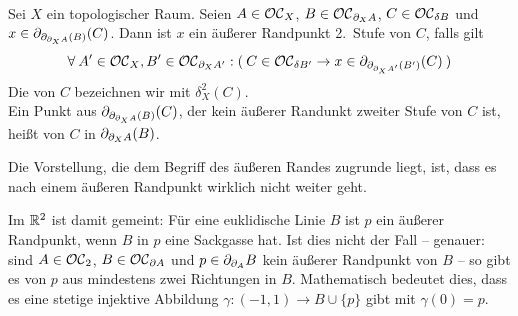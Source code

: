     \begin{dfn}\label{def:aeusserer-rand-2} \ \vspace{8pt}

        \noindent
        Sei $X$ ein topologischer Raum.
        Seien $A \in \mathcal{OC}_X$, $B \in \mathcal{OC}_{\partial_X A}$, $C \in \mathcal{OC}_{\delta B}$ und $x \in \partial_{\partial_{\partial_X A}(B)}(C)$. Dann ist $x$ ein äußerer Randpunkt 2.~Stufe von $C$, falls gilt
        \begin{align*}
            \forall\: A' \in \mathcal{OC}_X, B' \in \mathcal{OC}_{\partial_X A'} : (\: C \in \mathcal{OC}_{\delta B'} \rightarrow x \in \partial_{\partial_{\partial_X A'}(B')}(C) \:)
        \end{align*}
        Die  von $C$ bezeichnen wir mit $\delta_X^2(C)$.\\
        Ein Punkt aus $\partial_{\partial_{\partial_X A}(B)}(C)$, der kein äußerer Randunkt zweiter Stufe von $C$ ist, heißt  von $C$ in $\partial_{\partial_X A}(B)$.
    \end{dfn}
    
    Die Vorstellung, die dem Begriff des äußeren Randes zugrunde liegt, ist, dass es nach einem äußeren Randpunkt \glqq wirklich nicht weiter geht\grqq.
    

    Im
    $\mathbb{R}^2$ ist damit gemeint:
    Für eine euklidische Linie $B$ ist $p$ ein äußerer Randpunkt, wenn $B$ in $p$ eine Sackgasse hat.
    Ist dies nicht der Fall -- genauer: sind $A \in \mathcal{OC}_2$, $B \in \mathcal{OC}_{\partial A}$ und $p \in \partial_{\partial_A} B$ kein äußerer Randpunkt von $B$ -- so gibt es von $p$ aus mindestens zwei Richtungen in $B$.
    Mathematisch bedeutet dies, dass es eine stetige injektive Abbildung $\gamma:(-1,1) \to B \cup \{p\}$ gibt mit $\gamma(0) = p$.

